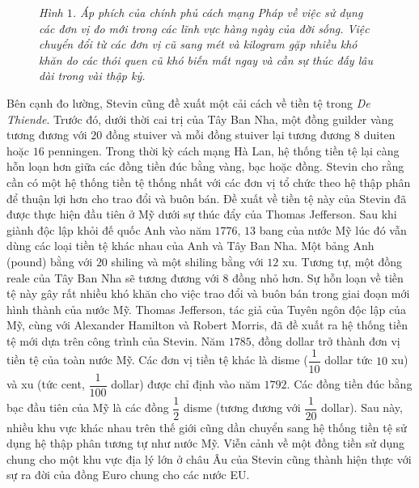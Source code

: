 \begin{multicols}{2}
\begin{figure}[H]
		\caption{\small\textit{\color{toanhocdoisong}Hình $1$. Áp phích của chính phủ cách mạng  Pháp về việc sử dụng các đơn vị đo mới trong các lĩnh vực hàng ngày của đời sống. Việc chuyển đổi từ các đơn vị cũ sang mét và kilogram gặp nhiều khó khăn do các thói quen cũ khó biến mất ngay và cần sự thúc đấy lâu dài trong vài thập kỷ.}}
		\vspace*{-5pt}
	\end{figure}
	\vskip 0.1cm
	\vskip 0.3cm
	Bên cạnh đo lường, Stevin cũng đề xuất một cải cách về tiền tệ trong \textit{De Thiende}. Trước đó, dưới thời cai trị của Tây Ban Nha, một đồng guilder vàng tương đương với $20$ đồng stuiver và mỗi đồng stuiver lại tương đương $8$ duiten hoặc $16$ penningen. Trong thời kỳ cách mạng Hà Lan, hệ thống tiền tệ lại càng hỗn loạn hơn giữa các đồng tiền đúc bằng vàng, bạc hoặc đồng. Stevin cho rằng cần có một hệ thống tiền tệ thống nhất với các đơn vị tổ chức theo hệ thập phân để thuận lợi hơn cho trao đổi và buôn bán. 
	\vskip 0.1cm
	Đề xuất về tiền tệ này của Stevin đã được thực hiện đầu tiên ở Mỹ dưới sự thúc đẩy của Thomas Jefferson. Sau khi giành độc lập khỏi đế quốc Anh vào năm $1776$, $13$ bang của nước Mỹ lúc đó vẫn dùng các loại tiền tệ khác nhau của Anh và Tây Ban Nha. Một bảng Anh (pound) bằng với $20$ shiling và một shiling bằng với $12$ xu. Tương tự, một đồng reale của Tây Ban Nha sẽ tương đương với $8$ đồng nhỏ hơn. Sự hỗn loạn về tiền tệ này gây rất nhiều khó khăn cho việc trao đổi và buôn bán trong giai đoạn mới hình thành của nước Mỹ. Thomas Jefferson, tác giả của Tuyên ngôn độc lập của Mỹ, cùng với Alexander Hamilton và Robert Morris, đã đề xuất ra hệ thống tiền tệ mới dựa trên công trình của Stevin. Năm $1785$, đồng dollar trở thành đơn vị tiền tệ của toàn nước Mỹ. Các đơn vị tiền tệ khác là disme ($\dfrac{1}{10}$ dollar tức $10$ xu) và xu (tức cent, $\dfrac{1}{100}$ dollar) được chỉ định vào năm $1792$. Các đồng tiền đúc bằng bạc đầu tiên của Mỹ là các đồng $\dfrac{1}{2}$ disme (tương đương với $\dfrac{1}{20}$ dollar). Sau này, nhiều khu vực khác nhau trên thế giới cũng dần chuyển sang hệ thống tiền tệ sử dụng hệ thập phân tương tự như nước Mỹ. Viễn cảnh về một đồng tiền sử dụng chung cho một khu vực địa lý lớn ở châu Âu của Stevin cũng thành hiện thực với sự ra đời của đồng Euro chung cho các nước EU.

\end{multicols}

